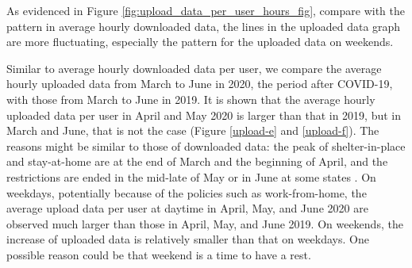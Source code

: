 As evidenced in Figure \ref{fig:upload_data_per_user_hours_fig}, compare with the pattern in average hourly downloaded data, the lines in the uploaded data graph are more fluctuating, especially the pattern for the uploaded data on weekends.

Similar to average hourly downloaded data per user, we compare the average hourly uploaded data from March to June in 2020, the period after COVID-19, with those from March to June in 2019. It is shown that the average hourly uploaded data per user in April and May 2020 is larger than that in 2019, but in March and June, that is not the case (Figure \ref{upload-e} and \ref{upload-f}). The reasons might be similar to those of downloaded data: the peak of shelter-in-place and stay-at-home are 
at the end of March and the beginning of April, and the restrictions are ended in the mid-late of May or in June at some states \cite{covid19restriction}. On weekdays, potentially because of the policies such as work-from-home, the average upload data per user at daytime in April, May, and June 2020 are observed much larger than those in April, May, and June 2019. On weekends, the increase of uploaded data is relatively smaller than that on weekdays. One possible reason could be that weekend is a time to have a rest.  